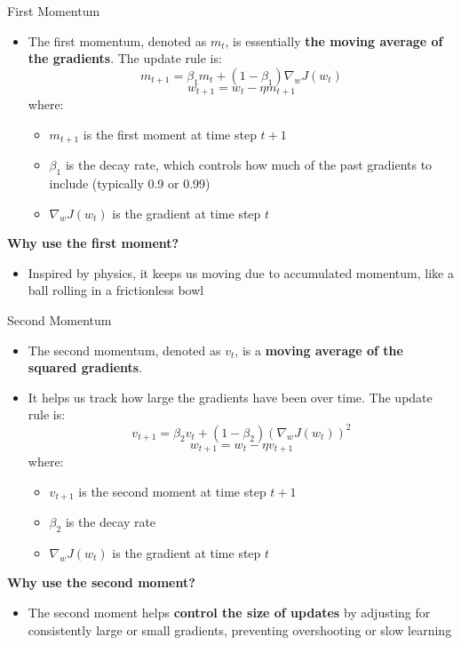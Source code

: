 \documentclass[serif, aspectratio=169]{beamer}
\begin{document}
\begin{frame}{First Momentum}
    \begin{itemize}
        \item The first momentum, denoted as $m_{t}$, is essentially \textbf{the moving average of the gradients}. The update rule is:
        \[m_{t+1} = \beta_1 m_t + (1 - \beta_1) \nabla_w J(w_t)\]
        \[w_{t+1} = w_t - \eta m_{t+1}\]
        where:
        \begin{itemize}
            \item $m_{t+1}$ is the first moment at time step $t+1$
            \item $\beta_1$ is the decay rate, which controls how much of the past gradients to include (typically 0.9 or 0.99)
            \item $\nabla_w J(w_t)$ is the gradient at time step $t$
        \end{itemize}
    \end{itemize}
    
    \textbf{Why use the first moment?}
    \begin{itemize}
        \item Inspired by physics, it keeps us moving due to accumulated momentum, like a ball rolling in a frictionless bowl 
    \end{itemize}
\end{frame}

\begin{frame}{Second Momentum}
    \begin{itemize}
        \item The second momentum, denoted as $v_{t}$, is a \textbf{moving average of the squared gradients}. 
        \item It helps us track how large the gradients have been over time. The update rule is:
        \[v_{t+1} = \beta_2 v_t + (1 - \beta_2) (\nabla_w J(w_t))^2\]
        \[w_{t+1} = w_t - \eta v_{t+1}\]
        where:
        \begin{itemize}
            \item $v_{t+1}$ is the second moment at time step $t+1$
            \item $\beta_2$ is the decay rate
            \item $\nabla_w J(w_t)$ is the gradient at time step $t$
        \end{itemize}
    \end{itemize}

    \textbf{Why use the second moment?}
    \begin{itemize}
        \item The second moment helps \textbf{control the size of updates} by adjusting for consistently large or small gradients, preventing overshooting or slow learning
    \end{itemize}
\end{frame}
\end{document}
